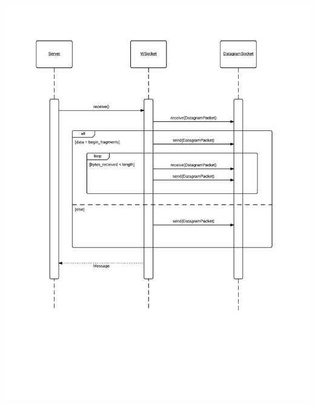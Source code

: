 \documentclass[11pt,english]{article}
\begin{document}
\includegraphics[width=6.2in]{figures/comm-protocol_seq-diagram_server.png}
\end{document}
